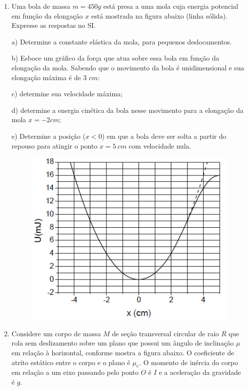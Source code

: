 \begin{enumerate}[start=1,label={\bfseries Q\arabic*.}]
\resposta


\item Uma bola de massa $m = 450 g$ está presa a uma mola cuja energia potencial em função da elongação $x$ está mostrada na figura abaixo (linha sólida). Expresse as respostas no SI.

a) Determine a constante elástica da mola, para pequenos deslocamentos.

\resposta

b) Esboce um gráfico da força que atua sobre essa bola em função da elongação da mola. Sabendo que o movimento da bola é unidimensional e sua elongação máxima é de 3 $cm$:

\resposta

c) determine sua velocidade máxima;

\resposta

d) determine a energia cinética da bola nesse movimento para a elongação da mola $x = - 2 cm$;

\resposta

e) Determine a posição ($x < 0$) em que a bola deve ser solta a partir do repouso para atingir o ponto $x = 5 \ cm$ com velocidade nula.

\begin{figure}[H]
\centering
\includegraphics[scale=0.8]{classica-img/grafico.png}
\end{figure}

\resposta

\item Considere um corpo de massa $M$ de seção transversal circular de raio $R$ que rola sem deslizamento sobre um plano que possui um ângulo de inclinação $\mu$ em relação à horizontal, conforme mostra a figura abaixo. O coeficiente de atrito estático entre o corpo e o plano é $\mu_{e}$. O momento
de inércia do corpo em relação a um eixo passando pelo ponto $O$ é $I$ e a aceleração da gravidade é $g$.



\end{enumerate}
